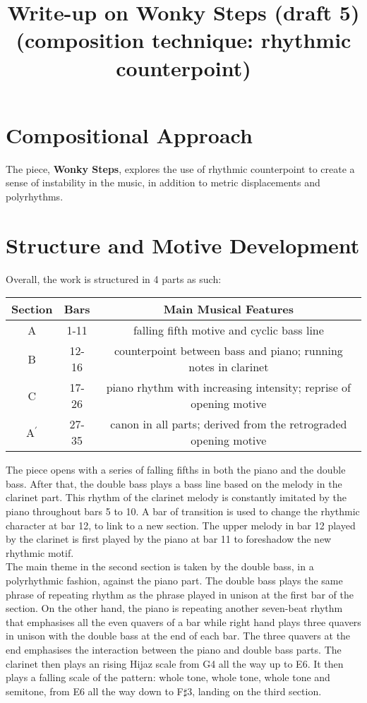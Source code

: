 \documentclass[a4paper]{article}
\title{Write-up on {\bf Wonky Steps} (draft 5)\\
(composition technique: rhythmic counterpoint)}
\author{}
\date{}
\begin{document}
\maketitle

\section{Compositional Approach}
The piece, {\bf Wonky Steps}, explores the use of rhythmic counterpoint to create a sense of instability in the music, in addition to metric displacements and polyrhythms.

\section{Structure and Motive Development}
Overall, the work is structured in 4 parts as such:

\begin{center}
	\def\arraystretch{1.5}
\begin{tabular}{|c|c|c|}
	\hline
	Section&Bars&Main Musical Features\\
	\hline
	A&1-11&falling fifth motive and cyclic bass line\\
	\hline
	B&12-16&counterpoint between bass and piano; running notes in clarinet\\
	\hline
	C&17-26&piano rhythm with increasing intensity; reprise of opening motive\\
	\hline
	A\(^\prime\)&27-35&canon in all parts; derived from the retrograded opening motive\\
	\hline
\end{tabular}
\end{center}

The piece opens with a series of falling fifths in both the piano and the double bass. After that, the double bass plays a bass line based on the melody in the clarinet part. This rhythm of the clarinet melody is constantly imitated by the piano throughout bars 5 to 10. A bar of transition is used to change the rhythmic character at bar 12, to link to a new section. The upper melody in bar 12 played by the clarinet is first played by the piano at bar 11 to foreshadow the new rhythmic motif.\\

The main theme in the second section is taken by the double bass, in a polyrhythmic fashion, against the piano part. The double bass plays the same phrase of repeating rhythm as the phrase played in unison at the first bar of the section. On the other hand, the piano is repeating another seven-beat rhythm that emphasises all the even quavers of a bar while right hand plays three quavers in unison with the double bass at the end of each bar. The three quavers at the end emphasises the interaction between the piano and double bass parts. The clarinet then plays an rising Hijaz scale from G4 all the way up to E6. It then plays a falling scale of the pattern: whole tone, whole tone, whole tone and semitone, from E6 all the way down to F\(\sharp\)3, landing on the third section.\\
\end{document}
